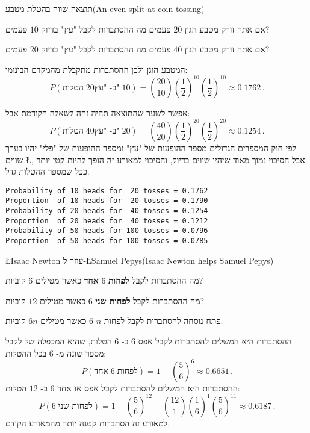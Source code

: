 
\begin{prob}{תוצאה שווה בהטלת מטבע}{}{(An even split at coin tossing)}

אם אתה זורק מטבע הגון 
$20$
פעמים מה ההסתברות לקבל "עץ" בדיוק 
$10$
פעמים?

אם אתה זורק מטבע הגון 
$40$
פעמים מה ההסתברות לקבל "עץ" בדיוק 
$20$
פעמים?
\end{prob}

\solution{}

המטבע הוגן ולכן ההסתברות מתקבלת מהמקדם הבינומי:
\[
P(\textrm{הטלות}\; 20\textrm{ב- "עץ"}\;10)=
{20 \choose 10} \left(\frac{1}{2}\right)^{10}\left(\frac{1}{2}\right)^{10}\approx 0.1762\,.
\]

אפשר לשער שהתוצאה תהיה זהה לשאלה הקודמת אבל:
\[
P(\textrm{הטלות}\;40\textrm{ב- "עץ"}\;20)=
{40 \choose 20} \left(\frac{1}{2}\right)^{20}\left(\frac{1}{2}\right)^{20}\approx 0.1254\,.
\]
לפי חוק המספרים הגדולים מספר ההופעות של "עץ" ומספר ההופעות של "פלי" יהיו בערך שווים
\L{\cite[Section~8.4]{ross}},
אבל הסיכוי נמוך מאוד שיהיו שווים בדיוק, והסיכוי למאורע זה הופך להיות קטן יותר ככל שמספר ההטלות גדל.

\sml{}
\begin{verbatim}
Probability of 10 heads for  20 tosses = 0.1762
Proportion  of 10 heads for  20 tosses = 0.1790
Probability of 20 heads for  40 tosses = 0.1254
Proportion  of 20 heads for  40 tosses = 0.1212
Probability of 50 heads for 100 tosses = 0.0796
Proportion  of 50 heads for 100 tosses = 0.0785
\end{verbatim}


\begin{prob}{\L{\small Isaac Newton} עוזר ל-\L{\small Samuel Pepys}}{}{(Isaac Newton helps Samuel Pepys)}

מה ההסתברות לקבל
\textbf{לפחות}
$6$
\textbf{אחד}
כאשר מטילים 
$6$
קוביות?

מה ההסתברות לקבל
\textbf{לפחות שני}
$6$
כאשר מטילים 
$12$
קוביות?

פתח נוסחה להסתברות לקבל לפחות
$n$ $6$
כאשר מטילים 
$6n$
קוביות.
\end{prob}

\solution{}

ההסתברות היא המשלים להסתברות לקבל אפס 
$6$
ב-%
$6$
הטלות, שהיא המכפלה של לקבל מספר שונה מ-%
$6$
בכל ההטלות:
\[
P(\textrm{אחד} \; 6\; \textrm{לפחות})=1-\left(\frac{5}{6}\right)^6\approx 0.6651\,.
\]
ההסתברות היא המשלים להסתברות לקבל אפס או אחד
$6$
ב-%
$12$
הטלות:
\[
P(6\; \textrm{לפחות שני})=1-\left(\frac{5}{6}\right)^{12}-{12\choose 1}\left(\frac{1}{6}\right)^{1}\left(\frac{5}{6}\right)^{11}\approx 0.6187\,.
\]
למאורע זה הסתברות קטנה יותר מהמאורע הקודם.

